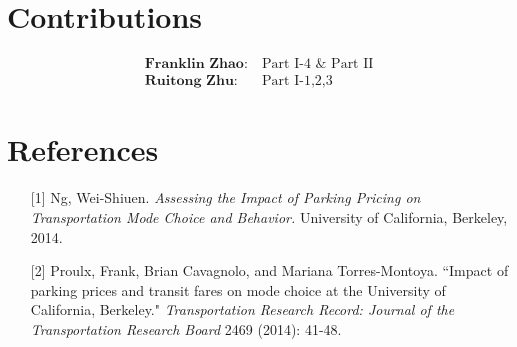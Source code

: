 \documentclass[12pt]{article}
\begin{document}
\section*{Contributions}
\setlength{\mathindent}{0cm}
\setlength{\abovedisplayskip}{0pt}
\begin{align*}
\textbf{Franklin Zhao:} &\  \text{Part\ I-4\ \&\ Part II}\\
\textbf{Ruitong Zhu:} &\  \text{Part\ I-1,2,3}
\end{align*}
\section*{References}
\begin{itemize}[noitemsep, topsep=0pt]
\item[{[1]}]\label{ref:Ng} Ng, Wei-Shiuen. \textit{Assessing the Impact of Parking Pricing on Transportation Mode Choice and Behavior.} University of California, Berkeley, 2014.
\item[{[2]}]\label{ref:Pr} Proulx, Frank, Brian Cavagnolo, and Mariana Torres-Montoya. ``Impact of parking prices and transit fares on mode choice at the University of California, Berkeley." \textit{Transportation Research Record: Journal of the Transportation Research Board} 2469 (2014): 41-48.
\end{itemize}
\end{document}
